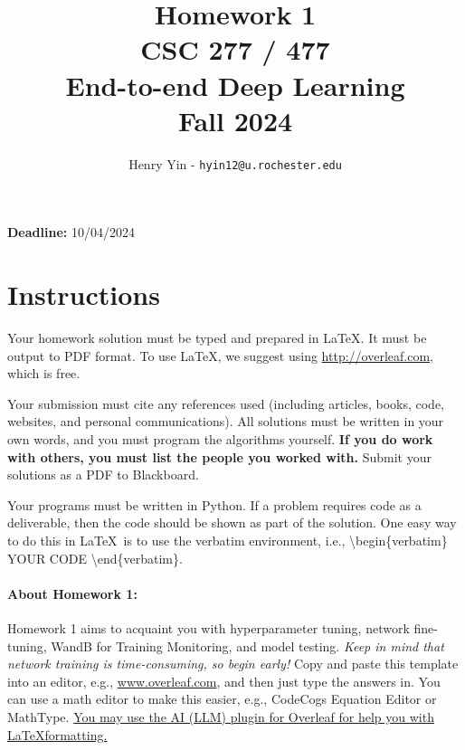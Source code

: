 \documentclass[11pt, oneside]{article}   	%
\title{Homework 1 \\ CSC 277 / 477 \\ End-to-end Deep Learning \\ Fall 2024}
\author{Henry Yin - \texttt{hyin12@u.rochester.edu}}
\date{}
\begin{document}
\maketitle

\begin{center}
    \textbf{Deadline:} 10/04/2024
\end{center}


\section*{Instructions}

Your homework solution must be typed and prepared in \LaTeX. It must be output to PDF format. To use \LaTeX, we suggest using \url{http://overleaf.com}, which is free.

Your submission must cite any references used (including articles, books, code, websites, and personal communications).  All solutions must be written in your own words, and you must program the algorithms yourself. \textbf{If you do work with others, you must list the people you worked with.} Submit your solutions as a PDF to Blackboard. 


Your programs must be written in Python. 
If a problem requires code as a deliverable, then the code should be shown as part of the solution. One easy way to do this in \LaTeX \, is to use the verbatim environment, i.e., \textbackslash begin\{verbatim\} YOUR CODE \textbackslash end\{verbatim\}.




\paragraph{About Homework 1:} Homework 1 aims to acquaint you with hyperparameter tuning, network fine-tuning, WandB for Training Monitoring, and model testing. \emph{Keep in mind that network training is time-consuming, so begin early!} Copy and paste this template into an editor, e.g., \url{www.overleaf.com}, and then just type the answers in. You can use a math editor to make this easier, e.g., CodeCogs Equation Editor or MathType. \href{https://blog.writefull.com/texgpt-harness-the-power-of-chatgpt-in-overleaf/}{You may use the AI (LLM) plugin for Overleaf for help you with \LaTeX formatting.}



\end{document}
